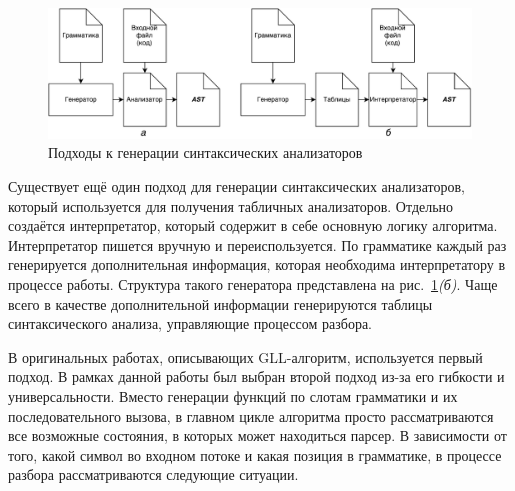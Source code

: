 \documentclass[14pt]{matmex-diploma}
\begin{document}
\begin{figure}
 \centering
 \includegraphics[width=15cm]{pics/GeneratorTypes.pdf}
 \caption{Подходы к генерации синтаксических анализаторов}
 \label{genTypes}
\end{figure}

Существует ещё один подход для генерации синтаксических анализаторов, который используется для получения табличных анализаторов. Отдельно создаётся интерпретатор, который содержит в себе основную логику алгоритма. Интерпретатор пишется вручную и переиспользуется. По грамматике каждый раз генерируется дополнительная информация, которая необходима интерпретатору в процессе работы. Структура такого генератора представлена на рис.~\ref{genTypes}{\it (б)}. Чаще всего в качестве дополнительной информации генерируются таблицы синтаксического анализа, управляющие процессом разбора.

В оригинальных работах, описывающих GLL-алгоритм, используется первый подход. В рамках данной работы был выбран второй подход из-за его гибкости и универсальности. Вместо генерации функций по слотам грамматики и их последовательного вызова, в главном цикле алгоритма просто рассматриваются все возможные состояния, в которых может находиться парсер. В зависимости от того, какой символ во входном потоке и какая позиция в грамматике, в процессе разбора рассматриваются следующие ситуации.
\end{document}

